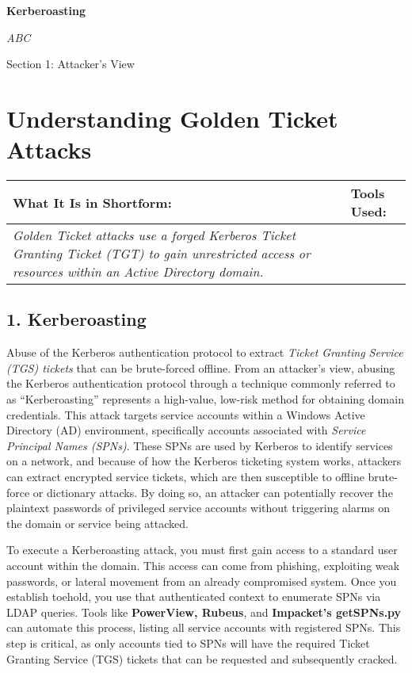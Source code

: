 
\textbf{Kerberoasting}

\textit{ABC}

Section 1: Attacker’s View

\section{\textbf{Understanding Golden Ticket Attacks}}

\begin{table}
\justifying

\begin{tabular}{| l | l |}
\hline
\textbf{What It Is in Shortform:} & \textbf{Tools Used:} \\
\hline
\textit{Golden Ticket attacks use a forged Kerberos Ticket Granting Ticket (TGT) to gain unrestricted access or resources within an Active Directory domain.} &  \\
\hline

\end{tabular}

\end{table}

\subsection{\textbf{1. Kerberoasting}}

Abuse of the Kerberos authentication protocol to extract \textit{Ticket Granting Service} \textit{(TGS) tickets} that can be brute-forced offline. From an attacker’s view, abusing the Kerberos authentication protocol through a technique commonly referred to as “Kerberoasting” represents a high-value, low-risk method for obtaining domain credentials. This attack targets service accounts within a Windows Active Directory (AD) environment, specifically accounts associated with \textit{Service Principal Names (SPNs)}. These SPNs are used by Kerberos to identify services on a network, and because of how the Kerberos ticketing system works, attackers can extract encrypted service tickets, which are then susceptible to offline brute-force or dictionary attacks. By doing so, an attacker can potentially recover the plaintext passwords of privileged service accounts without triggering alarms on the domain or service being attacked.

To execute a Kerberoasting attack, you must first gain access to a standard user account within the domain. This access can come from phishing, exploiting weak passwords, or lateral movement from an already compromised system. Once you establish toehold, you use that authenticated context to enumerate SPNs via LDAP queries. Tools like \textbf{PowerView, Rubeus}, and \textbf{Impacket’s getSPNs.py} can automate this process, listing all service accounts with registered SPNs. This step is critical, as only accounts tied to SPNs will have the required Ticket Granting Service (TGS) tickets that can be requested and subsequently cracked.


